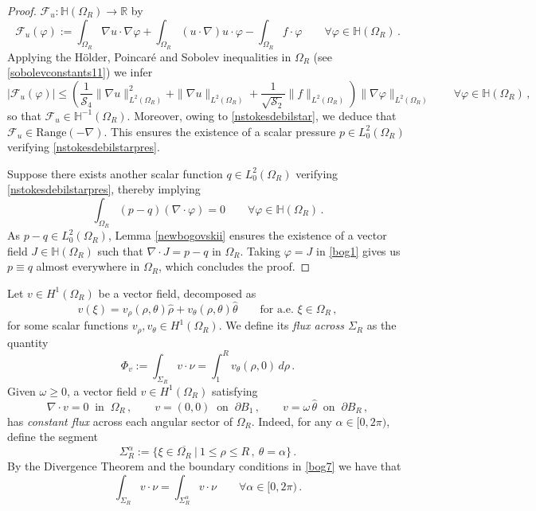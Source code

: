 \documentclass[a4paper,11pt]{article}
\numberwithin{equation}{section}
\numberwithin{figure}{section}
\begin{document}
\begin{proof}
$\mathcal{F}_u : \mathbb{H}(\Omega_{R}) \longrightarrow \mathbb{R}$ by
$$
\mathcal{F}_u(\varphi) := \int_{\Omega_{R}} \nabla u \cdot \nabla \varphi + \int_{\Omega_{R}} (u \cdot \nabla) u \cdot \varphi -
\int_{\Omega_{R}} f \cdot \varphi \qquad \forall \varphi \in \mathbb{H}(\Omega_{R}) \, .
$$
Applying the H\"older, Poincaré and Sobolev inequalities in $\Omega_{R}$ (see \eqref{sobolevconstants11}) we infer
$$
| \mathcal{F}_u(\varphi) | \leq \left( \dfrac{1}{\mathcal{S}_{4}} \| \nabla u \|^{2}_{L^{2}(\Omega_{R})} +  \| \nabla u \|_{L^{2}(\Omega_{R})} + \dfrac{1}{\sqrt{\mathcal{S}_{2}}} \| f \|_{L^{2}(\Omega_{R})} \right) \| \nabla \varphi \|_{L^{2}(\Omega_{R})} \qquad \forall \varphi \in \mathbb{H}(\Omega_{R}) \, ,
$$
so that $\mathcal{F}_u \in \mathbb{H}^{-1}(\Omega_{R})$. Moreover, owing  to \eqref{nstokesdebilstar}, we deduce that $\mathcal{F}_u\in
\text{Range}(-\nabla)$. This ensures the existence of a scalar pressure $p \in L_{0}^{2}(\Omega_{R})$ verifying \eqref{nstokesdebilstarpres}.
\par
Suppose there exists another scalar function $q \in L_{0}^{2}(\Omega_{R})$ verifying \eqref{nstokesdebilstarpres}, thereby implying
\begin{equation} \label{bog1}
\int_{\Omega_{R}} (p-q) (\nabla \cdot \varphi) = 0 \qquad \forall \varphi \in \mathbb{H}(\Omega_{R}) \, .
\end{equation}
As $p - q \in L_{0}^{2}(\Omega_{R})$, Lemma \ref{newbogovskii} ensures the existence of a vector field $J \in \mathbb{H}(\Omega_{R})$ such that $\nabla \cdot J = p-q$ in $\Omega_{R}$. Taking $\varphi = J$ in \eqref{bog1} gives us $p \equiv q$ almost everywhere in $\Omega_{R}$, which concludes the proof.
\end{proof}

Let $v \in H^{1}(\Omega_{R})$ be a vector field, decomposed as
$$
v(\xi) = v_{\rho}(\rho, \theta) \widehat{\rho} + v_{\theta}(\rho,\theta) \widehat{\theta} \qquad \text{for a.e. }\xi \in \Omega_{R}
\, ,
$$
for some scalar functions $v_{\rho}, v_{\theta}  \in H^{1}(\Omega_{R})$. We define its \textit{flux across $\Sigma_{R}$} as the quantity
$$
\Phi_{v} := \int_{\Sigma_{R}} v \cdot \nu = \int_{1}^{R} v_{\theta}(\rho,0) \, d\rho \, .
$$
Given $\omega \geq 0$, a vector field $v \in H^{1}(\Omega_{R})$ satisfying
\begin{equation} \label{bog7}
	\nabla\cdot v=0 \ \text{ in } \ \Omega_{R} \, , \qquad v = (0,0) \ \text{ on } \ \partial B_{1} \, , \qquad v = \omega \, \widehat{\theta} \
\text{ on } \ \partial B_{R}\, ,
\end{equation}
has \textit{constant flux} across each angular sector of $\Omega_{R}$. Indeed, for any $\alpha \in [0, 2 \pi)$, define the segment
$$
\Sigma^{\alpha}_{R} := \{ \xi \in \overline{\Omega_{R}} \ | \ 1 \leq \rho \leq R \, , \ \theta = \alpha \} \, .
$$
By the Divergence Theorem and the boundary conditions in \eqref{bog7} we have that
\begin{equation} \label{sameflux}
\int_{\Sigma_{R}} v \cdot \nu = \int_{\Sigma^{\alpha}_{R}} v \cdot \nu \qquad \forall \alpha \in [0, 2 \pi) \, .
\end{equation}
\end{document}
